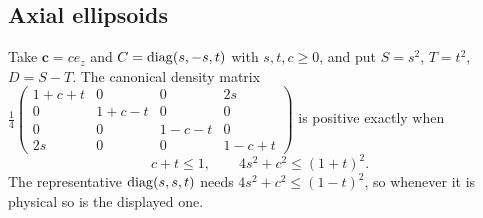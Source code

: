\documentclass[11pt]{article}
\theoremstyle{remark}\newtheorem{remark}[theorem]{Remark}
\newcommand{\cv}{\bm c}\newcommand{\av}{\bm a}\newcommand{\bv}{\bm b}
\begin{document}
\subsection{Axial ellipsoids}\label{sec:axial}
Take $\cv=ce_z$ and $C=\operatorname{diag}(s,-s,t)$ with $s,t,c\ge0$, and put $S=s^2$,
$T=t^2$, $D=S-T$. The canonical density matrix
$\frac14\left(\begin{smallmatrix}1+c+t&0&0&2s\\0&1+c-t&0&0\\0&0&1-c-t&0\\2s&0&0&1-c+t\end{smallmatrix}\right)$
is positive exactly when
\begin{equation}\label{eq:axial-physical}
 c+t\le1,\qquad 4s^2+c^2\le(1+t)^2.
\end{equation}
The representative $\operatorname{diag}(s,s,t)$ needs $4s^2+c^2\le(1-t)^2$, so whenever it is
physical so is the displayed one.
\end{document}
